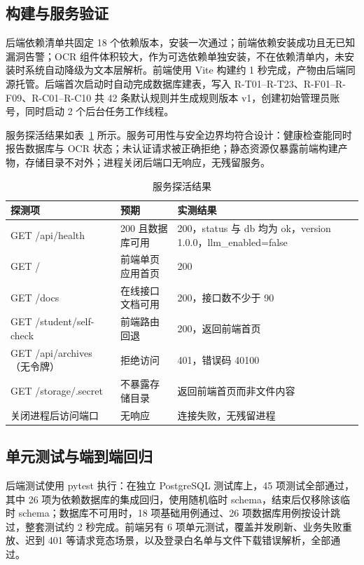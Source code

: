 \documentclass[12pt,a4paper]{ctexart}
\begin{document}
\subsection{构建与服务验证}

后端依赖清单共固定 18 个依赖版本，安装一次通过；前端依赖安装成功且无已知漏洞告警；OCR 组件体积较大，作为可选依赖单独安装，不在依赖清单内，未安装时系统自动降级为文本层解析。前端使用 Vite 构建约 1 秒完成，产物由后端同源托管。后端首次启动时自动完成数据库建表，写入 R-T01--R-T23、R-F01--R-F09、R-C01--R-C10 共 42 条默认规则并生成规则版本 v1，创建初始管理员账号，同时启动 2 个后台任务工作线程。

服务探活结果如表~\ref{tab:probe} 所示。服务可用性与安全边界均符合设计：健康检查能同时报告数据库与 OCR 状态；未认证请求被正确拒绝；静态资源仅暴露前端构建产物，存储目录不对外；进程关闭后端口无响应，无残留服务。

\begin{table}[H]
  \centering
  \caption{服务探活结果}
  \label{tab:probe}
  \begin{tabular}{p{4.4cm}p{3.0cm}p{6.4cm}}
    \toprule
    探测项 & 预期 & 实测结果 \\
    \midrule
    GET /api/health & 200 且数据库可用 & 200，status 与 db 均为 ok，version 1.0.0，llm\_enabled=false \\
    GET / & 前端单页应用首页 & 200 \\
    GET /docs & 在线接口文档可用 & 200，接口数不少于 90 \\
    GET /student/\allowbreak self-check & 前端路由回退 & 200，返回前端首页 \\
    GET /api/archives（无令牌） & 拒绝访问 & 401，错误码 40100 \\
    GET /storage/.secret & 不暴露存储目录 & 返回前端首页而非文件内容 \\
    关闭进程后访问端口 & 无响应 & 连接失败，无残留进程 \\
    \bottomrule
  \end{tabular}
\end{table}

\subsection{单元测试与端到端回归}

后端测试使用 pytest 执行：在独立 PostgreSQL 测试库上，45 项测试全部通过，其中 26 项为依赖数据库的集成回归，使用随机临时 schema，结束后仅移除该临时 schema；数据库不可用时，18 项基础用例通过、26 项数据库用例按设计跳过，整套测试约 2 秒完成。前端另有 6 项单元测试，覆盖并发刷新、业务失败重放、迟到 401 等请求竞态场景，以及登录白名单与文件下载错误解析，全部通过。
\end{document}
